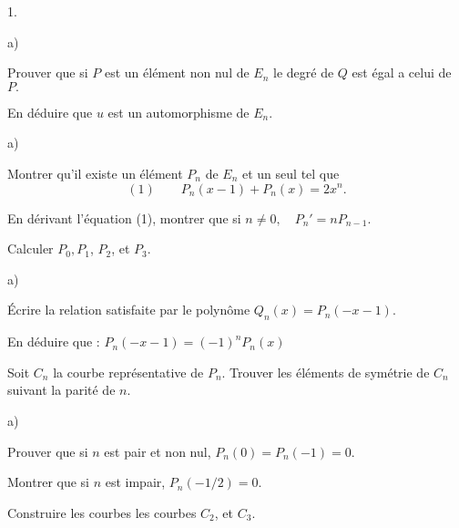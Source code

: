 \documentclass[11pt]{article}%
\begin{document}
\begin{noliste}{1.}
 \setlength{\itemsep}{4mm}
\item 

\begin{noliste}{a)}
 \setlength{\itemsep}{2mm}
\item Prouver que si $P$ est un élément non nul de $E_{n}$ le degré de
$Q$
est égal a celui de $P.$

\item En déduire que $u$ est un automorphisme de $E_{n}.$
\end{noliste}

\item 

\begin{noliste}{a)}
 \setlength{\itemsep}{2mm}
\item Montrer qu'il existe un élément $P_{n}$ de $E_{n}$ et un seul tel
que
\[
(1)\qquad P_{n}(x-1) + P_{n}(x) = 2x^{n}.
\]

\item En dérivant l'équation (1), montrer que si $n\neq 0,\quad
P_{n}{\prime } = nP_{n-1}.$

\item Calculer $P_{0},P_{1}$, $P_{2}$, et $P_{3}$.
\end{noliste}

\item 

\begin{noliste}{a)}
 \setlength{\itemsep}{2mm}
\item Écrire la relation satisfaite par le polynôme $Q_{n}(x) =
P_{n}(-x-1).$

\item En déduire que : $P_{n}(-x-1) = (-1)^{n}P_{n}(x)$

\item Soit $C_{n}$ la courbe représentative de $P_{n}$. Trouver les
éléments de symétrie de $C_{n}$ suivant la parité de $n.$
\end{noliste}

\item 

\begin{noliste}{a)}
 \setlength{\itemsep}{2mm}
\item Prouver que si $n$ est pair et non nul, $P_{n}(0) = P_{n}(-1) =
0.$

\item Montrer que si $n$ est impair, $P_{n}(-1/2) = 0.$
\end{noliste}

\item Construire les courbes les courbes $C_{2}$, et $C_{3}$.
\end{noliste}
\end{document}

